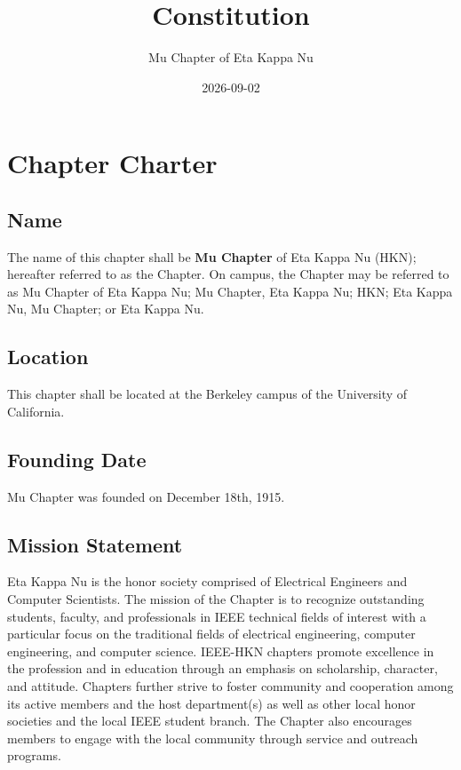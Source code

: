 \documentclass[11pt]{article}
\author{Mu Chapter of Eta Kappa Nu}
\date{2026-09-02}
\title{Constitution}
\begin{document}
\maketitle
\tableofcontents


\section{Chapter Charter}
\label{sec:org606f6bc}

\subsection{Name}
\label{sec:org2a4f184}

The name of this chapter shall be \textbf{\textbf{Mu Chapter}} of Eta Kappa Nu (HKN); hereafter referred to as the Chapter.
On campus, the Chapter may be referred to as Mu Chapter of Eta Kappa Nu; Mu Chapter, Eta Kappa Nu; HKN; Eta Kappa Nu, Mu Chapter; or Eta Kappa Nu.

\subsection{Location}
\label{sec:orgf18223d}

This chapter shall be located at the Berkeley campus of the University of California.

\subsection{Founding Date}
\label{sec:org7d0b1e0}

Mu Chapter was founded on December 18th, 1915.

\subsection{Mission Statement}
\label{sec:org7b46d92}

Eta Kappa Nu is the honor society comprised of Electrical Engineers and Computer Scientists.
The mission of the Chapter is to recognize outstanding students, faculty, and professionals in IEEE technical fields of interest with a particular focus on the traditional fields of electrical engineering, computer engineering, and computer science.
IEEE-HKN chapters promote excellence in the profession and in education through an emphasis on scholarship, character, and attitude.
Chapters further strive to foster community and cooperation among its active members and the host department(s) as well as other local honor societies and the local IEEE student branch.
The Chapter also encourages members to engage with the local community through service and outreach programs.
\end{document}

